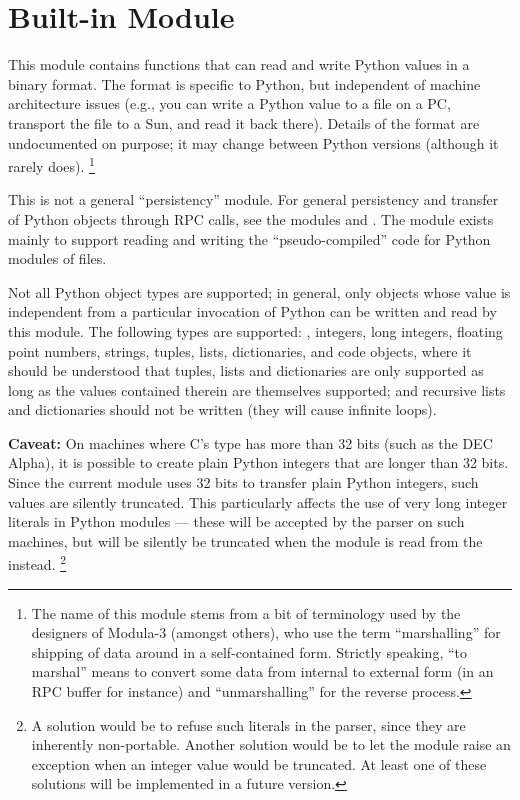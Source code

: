 \section{Built-in Module }

This module contains functions that can read and write Python
values in a binary format.  The format is specific to Python, but
independent of machine architecture issues (e.g., you can write a
Python value to a file on a PC, transport the file to a Sun, and read
it back there).  Details of the format are undocumented on purpose;
it may change between Python versions (although it rarely does).%
\footnote{The name of this module stems from a bit of terminology used
by the designers of Modula-3 (amongst others), who use the term
``marshalling'' for shipping of data around in a self-contained form.
Strictly speaking, ``to marshal'' means to convert some data from
internal to external form (in an RPC buffer for instance) and
``unmarshalling'' for the reverse process.}

This is not a general ``persistency'' module.  For general persistency
and transfer of Python objects through RPC calls, see the modules
 and .  The  module exists
mainly to support reading and writing the ``pseudo-compiled'' code for
Python modules of  files.

Not all Python object types are supported; in general, only objects
whose value is independent from a particular invocation of Python can
be written and read by this module.  The following types are supported:
, integers, long integers, floating point numbers,
strings, tuples, lists, dictionaries, and code objects, where it
should be understood that tuples, lists and dictionaries are only
supported as long as the values contained therein are themselves
supported; and recursive lists and dictionaries should not be written
(they will cause infinite loops).

{\bf Caveat:} On machines where C's  type has more than
32 bits (such as the DEC Alpha), it
is possible to create plain Python integers that are longer than 32
bits.  Since the current  module uses 32 bits to
transfer plain Python integers, such values are silently truncated.
This particularly affects the use of very long integer literals in
Python modules --- these will be accepted by the parser on such
machines, but will be silently be truncated when the module is read
from the  instead.%
\footnote{A solution would be to refuse such literals in the parser,
since they are inherently non-portable.  Another solution would be to
let the  module raise an exception when an integer value
would be truncated.  At least one of these solutions will be
implemented in a future version.}


